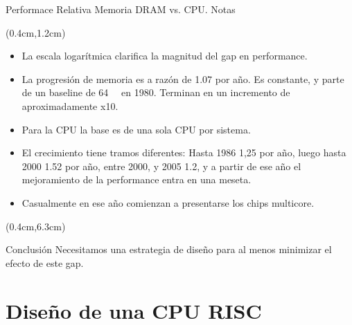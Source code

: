 \documentclass[table,dvipsnames,aspectratio=169]{beamer}
\begin{document}
\begin{frame}{Performace Relativa Memoria DRAM vs. CPU. Notas}
 \begin{textblock*}{\textwidth}(0.4cm,1.2cm)
  \begin{itemize}[<+->]\justifying \parskip 0.15cm
   \item La escala logarítmica clarifica la magnitud del gap en performance.
   \item La progresión de memoria es a razón de 1.07 por año. Es constante, y parte de un baseline de \SI{64}{\kibi\byte} en 1980. Terminan en un incremento de aproximadamente x10.
   \item Para la CPU la base es de una sola CPU por sistema.
   \item El crecimiento tiene tramos diferentes: Hasta 1986 1,25 por año, luego hasta 2000 1.52 por año, entre 2000, y 2005 1.2, y a partir de ese año el mejoramiento de la performance entra en una meseta.
   \item Casualmente en ese año comienzan a presentarse los chips multicore.
  \end{itemize}
 \end{textblock*}
 \begin{textblock*}{\textwidth}(0.4cm,6.3cm)
   {
  \begin{block}{Conclusión}
   \justifying Necesitamos una estrategia de diseño para al menos minimizar el efecto de este gap.
  \end{block}
  }
 \end{textblock*}
\end{frame}
%
\section{Diseño de una CPU RISC}
\end{document}
